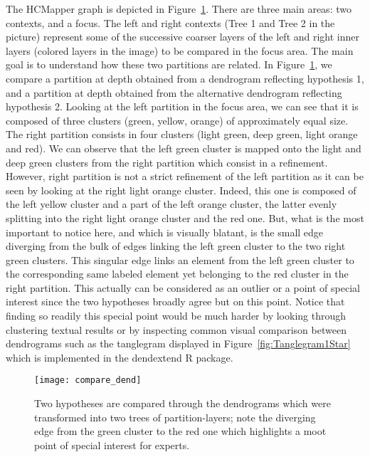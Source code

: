 \documentclass[10pt,conference,a4paper]{IEEEtran}
\begin{document}
The HCMapper graph is depicted in Figure~\ref{compare_dend}. There are three main areas: two contexts, and a focus. The left and right contexts (Tree 1 and Tree 2 in the picture) represent some of the successive coarser layers of the left and right inner layers (colored layers in the image) to be compared in the focus area. The main goal is to understand how these two partitions are related. In Figure~\ref{compare_dend}, we compare a partition at depth  obtained from a dendrogram reflecting hypothesis 1, and a partition at depth  obtained from the alternative dendrogram reflecting hypothesis 2. Looking at the left partition in the focus area, we can see that it is composed of three clusters (green, yellow, orange) of approximately equal size. The right partition consists in four clusters (light green, deep green, light orange and red). We can observe that the left green cluster is mapped onto the light and deep green clusters from the right partition which consist in a refinement.
However, right partition is not a strict refinement of the left partition as it can be seen by looking at the right light orange cluster. Indeed, this one is composed of the left yellow cluster and a part of the left orange cluster, the latter evenly splitting into the right light orange cluster and the red one.
But, what is the most important to notice here, and which is visually blatant, is the small edge diverging from the bulk of edges linking the left green cluster to the two right green clusters. This singular edge links an element from the left green cluster to the corresponding same labeled element yet belonging to the red cluster in the right partition. This actually can be considered as an outlier or a point of special interest since the two hypotheses broadly agree but on this point.
Notice that finding so readily this special point would be much harder by looking through clustering textual results or by inspecting common visual comparison between dendrograms such as the tanglegram displayed in Figure~\ref{fig:Tanglegram1Star} which is implemented in the dendextend R package.




\begin{figure}[htb]
  \centering
\texttt{[image: compare\_dend]}
  \caption{Two hypotheses are compared through the dendrograms which were transformed into two trees of partition-layers; note the diverging edge from the green cluster to the red one which highlights a moot point of special interest for experts.}
  \label{compare_dend}
\end{figure}
\end{document}
